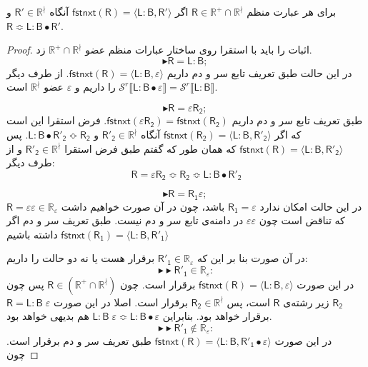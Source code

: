 \begin{thm}
	برای هر عبارت منظم 
	$\mathsf{R} \in \mathbb{R^+ \cap R^\nmid}$
	اگر 
	$\mathsf{fstnxt(R)=\langle L:B , R'\rangle}$
		آنگاه 
	$\mathsf{R'}\in \mathbb{R}^\nmid$
	و 
	$\mathsf{R \Bumpeq L:B\bullet R'}$.
\end{thm}
\begin{proof}
	اثبات را باید با استقرا روی ساختار عبارات منظم عضو 
	$\mathbb{R^+ \cap R^\nmid}$
	زد.
	$$\blacktriangleright\mathsf{R=L:B;\:}$$
	در این حالت طبق تعریف تابع سر و دم داریم
	$\mathsf{fstnxt(R)=\langle L:B , \varepsilon \rangle}$.
	از طرف دیگر \break
	$\mathcal{S}^r\llbracket \mathsf{L:B \bullet \varepsilon} \rrbracket = 
	\mathcal{S}^r \llbracket \mathsf{L:B} \rrbracket$
	را داریم و $\varepsilon$ عضو $\mathbb{R^\nmid}$ است.
	
	$$\blacktriangleright\mathsf{R=\varepsilon R_2;\:}$$
	طبق تعریف تابع سر و دم داریم
	$\mathsf{fstnxt(\varepsilon R_2) = fstnxt(R_2)}$.
		فرض استقرا این است که اگر 
		$\mathsf{fstnxt(R_2)=\langle L:B, R'_2 \rangle}$
	آنگاه 
	$\mathsf{R'_2}\in \mathbb{R^\nmid}$
	و
	$\mathsf{L:B \bullet R'_2} \Bumpeq  \mathsf{R_2}$.
	پس 
	$\mathsf{fstnxt(R)=\langle L:B , R'_2 \rangle}$
	که همان‌ طور که گفتم طبق فرض استقرا 
	$\mathsf{R'_2} \in \mathbb{R^\nmid}$
	و از طرف دیگر:
	$$\mathsf{R=\varepsilon R_2 \Bumpeq R_2 \Bumpeq L:B \bullet R'_2 }$$
			
	
	
	
	
	
	$$\blacktriangleright\mathsf{R=R_1 \varepsilon;\:}$$
	در این حالت امکان ندارد $\mathsf{R_1=\varepsilon}$ باشد، چون در آن صورت خواهیم داشت 
	$\mathsf{R=\varepsilon \varepsilon} \in \mathbb{R_\varepsilon}$
	که تناقض است چون $\varepsilon \varepsilon$ در دامنه‌ی تابع سر و دم نیست.
	طبق تعریف سر و دم اگر داشته باشیم 
	$\mathsf {fstnxt(R_1)=\langle L:B , R'_1 \rangle}$
	
در آن صورت بنا بر این که 
$\mathsf{R'_1} \in \mathbb{R_\varepsilon}$
برقرار هست یا نه دو حالت را داریم:
	$$\blacktriangleright\blacktriangleright \mathsf{R'_1} \in \mathbb{R_\varepsilon}: $$
	در این صورت 
	$\mathsf{fstnxt(R)=\langle L:B , \varepsilon \rangle}$
برقرار است. چون
 $\mathsf{R} \in \mathbb{( \mathbb{R^+ \cap R^\nmid})}$
  پس 
  چون
  $\mathsf{R_2}$
  زیر رشته‌ی $\mathsf{R}$ است، پس
  $\mathsf{R_2 \in} \mathbb{R^\nmid}$
  برقرار است. اصلا در این صورت $\mathsf{R=L:B\;\varepsilon}$ برقرار خواهد بود. بنابراین
  $\mathsf{L:B\;\varepsilon \Bumpeq L:B \bullet \varepsilon}$
  هم بدیهی خواهد بود.
  $$\blacktriangleright\blacktriangleright \mathsf{R'_1} \notin \mathbb{R_\varepsilon}: $$
در این صورت 
$\mathsf{fstnxt(R)=\langle L:B , R'_1 \bullet \varepsilon \rangle}$
طبق تعریف سر و دم برقرار است. چون 


\end{proof}
